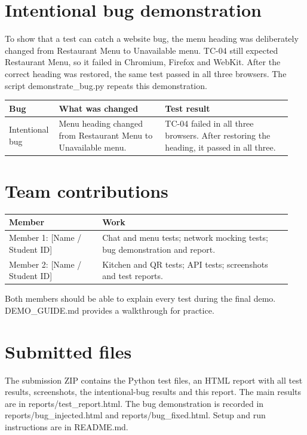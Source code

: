 \documentclass[10pt,a4paper]{article}
\begin{document}
\section{Intentional bug demonstration}

To show that a test can catch a website bug, the menu heading was deliberately changed from Restaurant Menu to Unavailable menu. TC-04 still expected Restaurant Menu, so it failed in Chromium, Firefox and WebKit. After the correct heading was restored, the same test passed in all three browsers. The script demonstrate\_bug.py repeats this demonstration.

\small
\begin{longtable}{p{0.15\linewidth}p{0.36\linewidth}p{0.43\linewidth}}
\toprule
\textbf{Bug} & \textbf{What was changed} & \textbf{Test result} \\ \midrule \endhead
Intentional bug & Menu heading changed from Restaurant Menu to Unavailable menu. & TC-04 failed in all three browsers. After restoring the heading, it passed in all three. \\
\bottomrule\end{longtable}
\normalsize

\section{Team contributions}

\small
\begin{longtable}{p{0.31\linewidth}p{0.63\linewidth}}
\toprule
\textbf{Member} & \textbf{Work} \\ \midrule \endhead
Member 1: [Name / Student ID] & Chat and menu tests; network mocking tests; bug demonstration and report. \\
Member 2: [Name / Student ID] & Kitchen and QR tests; API tests; screenshots and test reports. \\
\bottomrule\end{longtable}
\normalsize

Both members should be able to explain every test during the final demo. DEMO\_GUIDE.md provides a walkthrough for practice.

\section{Submitted files}

The submission ZIP contains the Python test files, an HTML report with all test results, screenshots, the intentional-bug results and this report. The main results are in reports/test\_report.html. The bug demonstration is recorded in reports/bug\_injected.html and reports/bug\_fixed.html. Setup and run instructions are in README.md.
\end{document}
